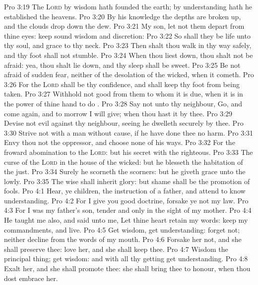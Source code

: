 \vs Pro 3:19 The \textsc{Lord} by wisdom hath founded the earth; by understanding hath he established the heavens.
\vs Pro 3:20 By his knowledge the depths are broken up, and the clouds drop down the dew.
\vs Pro 3:21 My son, let not them depart from thine eyes: keep sound wisdom and discretion:
\vs Pro 3:22 So shall they be life unto thy soul, and grace to thy neck.
\vs Pro 3:23 Then shalt thou walk in thy way safely, and thy foot shall not stumble.
\vs Pro 3:24 When thou liest down, thou shalt not be afraid: yea, thou shalt lie down, and thy sleep shall be sweet.
\vs Pro 3:25 Be not afraid of sudden fear, neither of the desolation of the wicked, when it cometh.
\vs Pro 3:26 For the \textsc{Lord} shall be thy confidence, and shall keep thy foot from being taken.
\vs Pro 3:27 Withhold not good from them to whom it is due, when it is in the power of thine hand to do .
\vs Pro 3:28 Say not unto thy neighbour, Go, and come again, and to morrow I will give; when thou hast it by thee.
\vs Pro 3:29 Devise not evil against thy neighbour, seeing he dwelleth securely by thee.
\vs Pro 3:30 Strive not with a man without cause, if he have done thee no harm.
\vs Pro 3:31 Envy thou not the oppressor, and choose none of his ways.
\vs Pro 3:32 For the froward  abomination to the \textsc{Lord}: but his secret  with the righteous.
\vs Pro 3:33 The curse of the \textsc{Lord}  in the house of the wicked: but he blesseth the habitation of the just.
\vs Pro 3:34 Surely he scorneth the scorners: but he giveth grace unto the lowly.
\vs Pro 3:35 The wise shall inherit glory: but shame shall be the promotion of fools.
\vs Pro 4:1 Hear, ye children, the instruction of a father, and attend to know understanding.
\vs Pro 4:2 For I give you good doctrine, forsake ye not my law.
\vs Pro 4:3 For I was my father's son, tender and only  in the sight of my mother.
\vs Pro 4:4 He taught me also, and said unto me, Let thine heart retain my words: keep my commandments, and live.
\vs Pro 4:5 Get wisdom, get understanding: forget  not; neither decline from the words of my mouth.
\vs Pro 4:6 Forsake her not, and she shall preserve thee: love her, and she shall keep thee.
\vs Pro 4:7 Wisdom  the principal thing;  get wisdom: and with all thy getting get understanding.
\vs Pro 4:8 Exalt her, and she shall promote thee: she shall bring thee to honour, when thou dost embrace her.
